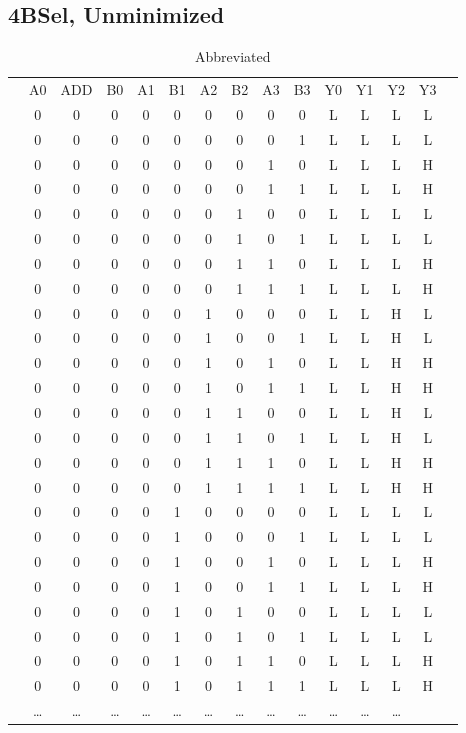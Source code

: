 \documentclass[letterpaper,titlepage,oneside]{article}
\begin{document}
\pagebreak
\subsection*{4BSel, Unminimized}
\begin{table}['h']
\begin{tabular}{c|c|c|c|c|c|c|c|c|c|c|c|c|c|c}
\cline{2-14}
 & A0 & ADD & B0 & A1 & B1 & A2 & B2 & A3 & B3 & Y0 & Y1 & Y2 & Y3 &  \\ \cline{2-14}

 & 0 & 0 & 0 & 0 & 0 & 0 & 0 & 0 & 0 & L & L & L & L\\
 & 0 & 0 & 0 & 0 & 0 & 0 & 0 & 0 & 1 & L & L & L & L\\
 & 0 & 0 & 0 & 0 & 0 & 0 & 0 & 1 & 0 & L & L & L & H\\
 & 0 & 0 & 0 & 0 & 0 & 0 & 0 & 1 & 1 & L & L & L & H\\
 & 0 & 0 & 0 & 0 & 0 & 0 & 1 & 0 & 0 & L & L & L & L\\
 & 0 & 0 & 0 & 0 & 0 & 0 & 1 & 0 & 1 & L & L & L & L\\
 & 0 & 0 & 0 & 0 & 0 & 0 & 1 & 1 & 0 & L & L & L & H\\
 & 0 & 0 & 0 & 0 & 0 & 0 & 1 & 1 & 1 & L & L & L & H\\
 & 0 & 0 & 0 & 0 & 0 & 1 & 0 & 0 & 0 & L & L & H & L\\
 & 0 & 0 & 0 & 0 & 0 & 1 & 0 & 0 & 1 & L & L & H & L\\
 & 0 & 0 & 0 & 0 & 0 & 1 & 0 & 1 & 0 & L & L & H & H\\
 & 0 & 0 & 0 & 0 & 0 & 1 & 0 & 1 & 1 & L & L & H & H\\
 & 0 & 0 & 0 & 0 & 0 & 1 & 1 & 0 & 0 & L & L & H & L\\
 & 0 & 0 & 0 & 0 & 0 & 1 & 1 & 0 & 1 & L & L & H & L\\
 & 0 & 0 & 0 & 0 & 0 & 1 & 1 & 1 & 0 & L & L & H & H\\
 & 0 & 0 & 0 & 0 & 0 & 1 & 1 & 1 & 1 & L & L & H & H\\
 & 0 & 0 & 0 & 0 & 1 & 0 & 0 & 0 & 0 & L & L & L & L\\
 & 0 & 0 & 0 & 0 & 1 & 0 & 0 & 0 & 1 & L & L & L & L\\
 & 0 & 0 & 0 & 0 & 1 & 0 & 0 & 1 & 0 & L & L & L & H\\
 & 0 & 0 & 0 & 0 & 1 & 0 & 0 & 1 & 1 & L & L & L & H\\
 & 0 & 0 & 0 & 0 & 1 & 0 & 1 & 0 & 0 & L & L & L & L\\
 & 0 & 0 & 0 & 0 & 1 & 0 & 1 & 0 & 1 & L & L & L & L\\
 & 0 & 0 & 0 & 0 & 1 & 0 & 1 & 1 & 0 & L & L & L & H\\
 & 0 & 0 & 0 & 0 & 1 & 0 & 1 & 1 & 1 & L & L & L & H\\
 & \ldots{} & \ldots{} & \ldots{} & \ldots{} & \ldots{} & \ldots{} & %
\ldots{} & \ldots{} & \ldots{} & \ldots{} & \ldots{} & \ldots{} & \\

\cline{2-14}
\end{tabular}
\caption{Abbreviated}\label{table:4BSel_Unminimized}
\end{table}
\end{document}
